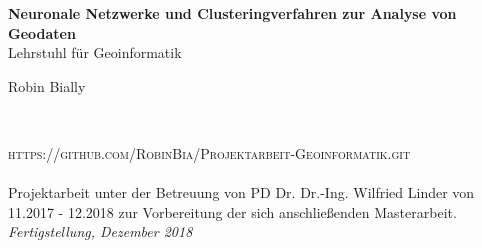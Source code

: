 \documentclass[11pt,ceqn]{book}
\begin{document}


\begingroup
\thispagestyle{empty}
\centering
\vspace*{5cm}
\par\normalfont\fontsize{35}{35}\sffamily\selectfont
\textbf{{\color{white} Neuronale Netzwerke und Clusteringverfahren zur Analyse von Geodaten}}\\
{\LARGE {\color{white}Lehrstuhl für Geoinformatik}}\par
\vspace*{1cm}
{\Huge {\color{white} Robin Bially}}\par 
\endgroup


\newpage
~\vfill
\thispagestyle{empty}

\noindent \textsc{https://github.com/RobinBia/Projektarbeit-Geoinformatik.git}\\ \\ %

\noindent Projektarbeit unter der Betreuung von PD Dr. Dr.-Ing. Wilfried Linder von 11.2017 - 12.2018 zur Vorbereitung der sich anschließenden Masterarbeit.\\ %

\noindent \textit{Fertigstellung, Dezember 2018} 


\raggedright
{}
\pagestyle{empty} 
\tableofcontents 
\pagestyle{fancy} 



\end{document}
